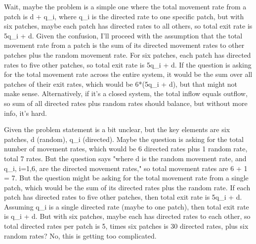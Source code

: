 Wait, maybe the problem is a simple one where the total movement rate from a patch is d + q_i, where q_i is the directed rate to one specific patch, but with six patches, maybe each patch has directed rates to all others, so total exit rate is 5q_i + d. Given the confusion, I'll proceed with the assumption that the total movement rate from a patch is the sum of its directed movement rates to other patches plus the random movement rate. For six patches, each patch has directed rates to five other patches, so total exit rate is 5q_i + d. If the question is asking for the total movement rate across the entire system, it would be the sum over all patches of their exit rates, which would be 6*(5q_i + d), but that might not make sense. Alternatively, if it's a closed system, the total inflow equals outflow, so sum of all directed rates plus random rates should balance, but without more info, it's hard. 

Given the problem statement is a bit unclear, but the key elements are six patches, d (random), q_i (directed). Maybe the question is asking for the total number of movement rates, which would be 6 directed rates plus 1 random rate, total 7 rates. But the question says "where d is the random movement rate, and q_i, i=1,6, are the directed movement rates," so total movement rates are 6 + 1 = 7. But the question might be asking for the total movement rate from a single patch, which would be the sum of its directed rates plus the random rate. If each patch has directed rates to five other patches, then total exit rate is 5q_i + d. Assuming q_i is a single directed rate (maybe to one patch), then total exit rate is q_i + d. But with six patches, maybe each has directed rates to each other, so total directed rates per patch is 5, times six patches is 30 directed rates, plus six random rates? No, this is getting too complicated. 

